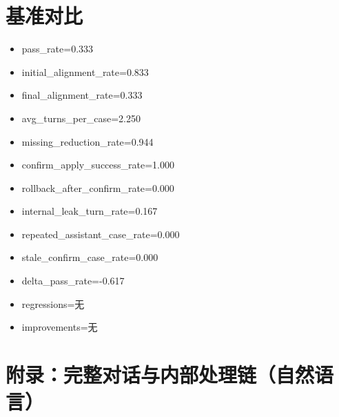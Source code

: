 \documentclass[11pt]{ctexart}
\begin{document}
\section{基准对比}
\begin{itemize}
\item pass\_rate=0.333
\item initial\_alignment\_rate=0.833
\item final\_alignment\_rate=0.333
\item avg\_turns\_per\_case=2.250
\item missing\_reduction\_rate=0.944
\item confirm\_apply\_success\_rate=1.000
\item rollback\_after\_confirm\_rate=0.000
\item internal\_leak\_turn\_rate=0.167
\item repeated\_assistant\_case\_rate=0.000
\item stale\_confirm\_case\_rate=0.000
\item delta\_pass\_rate=-0.617
\item regressions=无
\item improvements=无
\end{itemize}
\appendix
\section{附录：完整对话与内部处理链（自然语言）}
\end{document}
